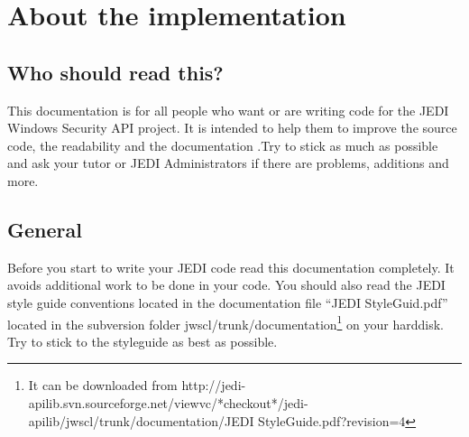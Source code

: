 \documentclass[a4paper,twoside,10pt]{report}
\begin{document}

\chapter{About the implementation}

\section{Who should read this?}
This documentation is for all people who want or are writing code for the JEDI Windows Security API project. It is intended to help them to improve the source code, the readability and the documentation .Try to stick as much as possible and ask your tutor or JEDI Administrators if there are problems, additions and more.

\section{General}

Before you start to write your JEDI code read this documentation completely. It avoids additional work to be done in your code. You should also read the JEDI style guide conventions located in the documentation file "`JEDI StyleGuid.pdf"' located in the subversion folder jwscl/trunk/documentation\footnote{It can be downloaded from http://jedi-apilib.svn.sourceforge.net/viewvc/*checkout*/jedi-apilib/jwscl/trunk/documentation/JEDI StyleGuide.pdf?revision=4} on your harddisk. Try to stick to the styleguide as best as possible.
\end{document}
